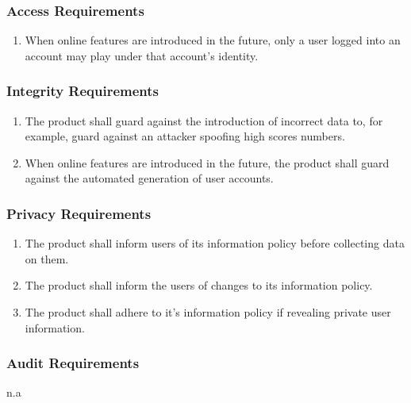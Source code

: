 \documentclass[]{article}
\begin{document}
\subsubsection{Access Requirements}
\label{ssub:access_requirements}
\begin{enumerate}[{SR}1. ]
	\item When online features are introduced in the future, only a user logged into an account may play under that account's identity.
	\holdEnum
\end{enumerate}

\subsubsection{Integrity Requirements}
\label{ssub:integrity_requirements}
\begin{enumerate}[{SR}1. ]
	\resumeEnum
	\item The product shall guard against the introduction of incorrect data to, for example, guard against an attacker spoofing high scores numbers.
	\item When online features are introduced in the future, the product shall guard against the automated generation of user accounts.
	\holdEnum
\end{enumerate}

\subsubsection{Privacy Requirements}
\label{ssub:privacy_requirements}
\begin{enumerate}[{SR}1. ]
	\resumeEnum
	\item The product shall inform users of its information policy before collecting data on them.
	\item The product shall inform the users of changes to its information policy.
	\item The product shall adhere to it's information policy if revealing private user information.
	\holdEnum
\end{enumerate}

\subsubsection{Audit Requirements}
\label{ssub:audit_requirements}
n.a
\end{document}
